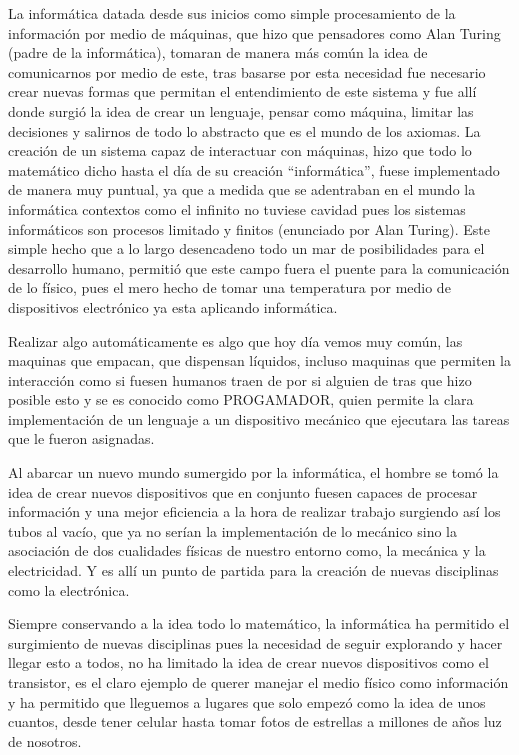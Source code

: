 \documentclass[11pt]{article}
\begin{document}
La informática datada desde sus inicios como simple procesamiento de la información por medio de máquinas, que  hizo que pensadores como Alan Turing (padre de la informática), tomaran de manera más común la idea de comunicarnos por medio de este, tras basarse por esta necesidad fue necesario crear nuevas formas que permitan el entendimiento de este sistema y fue allí donde surgió la idea de crear un lenguaje, pensar como máquina, limitar las decisiones y salirnos de todo lo abstracto que es el mundo de los axiomas.
La creación de un sistema capaz de interactuar con máquinas, hizo que todo lo matemático dicho hasta el día de su creación “informática”, fuese implementado de manera muy puntual, ya que a medida que se adentraban en el mundo la informática contextos como el infinito no tuviese cavidad pues los sistemas informáticos son procesos limitado y finitos (enunciado por Alan Turing).
Este simple hecho que a lo largo desencadeno todo un mar de posibilidades para el desarrollo humano, permitió que este campo fuera el puente para la comunicación de lo físico, pues el mero hecho de tomar una temperatura por medio de dispositivos electrónico ya esta aplicando informática. 

Realizar algo automáticamente es algo que hoy día vemos muy común, las maquinas que empacan, que dispensan líquidos, incluso maquinas que permiten la interacción como si fuesen humanos traen de por si alguien de tras que hizo posible esto y se es conocido como PROGAMADOR, quien permite la clara implementación de un lenguaje a un dispositivo mecánico que ejecutara las tareas que le fueron asignadas.

Al abarcar un nuevo mundo sumergido por la informática, el hombre se tomó la idea de crear nuevos dispositivos que en conjunto fuesen capaces de procesar información y una mejor eficiencia a la hora de realizar trabajo surgiendo así los tubos al vacío, que ya no serían la implementación de lo mecánico sino la asociación de dos cualidades físicas de nuestro entorno como, la mecánica y la electricidad. Y es allí un punto de partida para la creación de nuevas disciplinas como la electrónica.

Siempre conservando a la idea todo lo matemático, la informática ha permitido el surgimiento de nuevas disciplinas pues la necesidad de seguir explorando y hacer llegar esto a todos, no ha limitado la idea de crear nuevos dispositivos como el transistor, es el claro ejemplo de querer manejar el medio físico como información y ha permitido que lleguemos a lugares que solo empezó como la idea de unos cuantos, desde tener celular hasta tomar fotos de estrellas a millones de años luz de nosotros.
\end{document}
